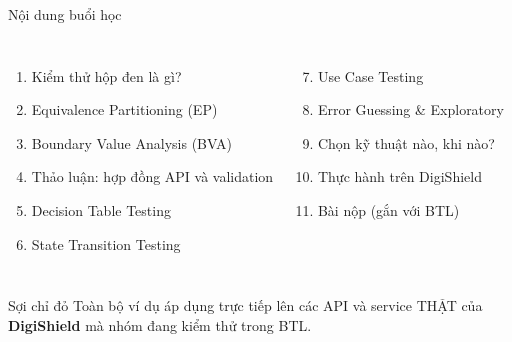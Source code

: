 \documentclass[aspectratio=169,12pt]{beamer}
\begin{document}
\begin{frame}{Nội dung buổi học}
  \begin{columns}[T]
    \begin{enumerate}
      \item Kiểm thử hộp đen là gì?
      \item Equivalence Partitioning (EP)
      \item Boundary Value Analysis (BVA)
      \item Thảo luận: hợp đồng API và validation
      \item Decision Table Testing
      \item State Transition Testing
    \end{enumerate}
    \begin{enumerate}
      \setcounter{enumi}{6}
      \item Use Case Testing
      \item Error Guessing \& Exploratory
      \item Chọn kỹ thuật nào, khi nào?
      \item Thực hành trên DigiShield
      \item Bài nộp (gắn với BTL)
    \end{enumerate}
  \end{columns}

  \vspace{0.5em}
  \begin{exampleblock}{Sợi chỉ đỏ}
    Toàn bộ ví dụ áp dụng trực tiếp lên các API và service THẬT của
    \textbf{DigiShield} mà nhóm đang kiểm thử trong BTL.
  \end{exampleblock}
\end{frame}
\end{document}
